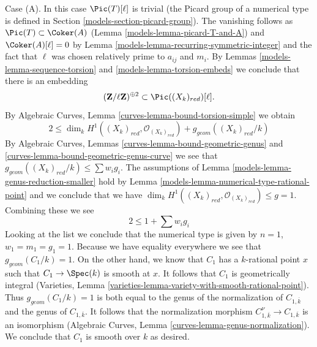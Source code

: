 \medskip\noindent
Case (A). In this case $\Pic(T)[\ell]$ is trivial (the Picard group
of a numerical type is defined in Section \ref{models-section-picard-group}).
The vanishing follows as $\Pic(T) \subset \Coker(A)$
(Lemma \ref{models-lemma-picard-T-and-A}) and $\Coker(A)[\ell] = 0$ by
Lemma \ref{models-lemma-recurring-symmetric-integer} and the
fact that $\ell$ was chosen relatively prime to $a_{ij}$ and $m_i$.
By Lemmas \ref{models-lemma-sequence-torsion} and \ref{models-lemma-torsion-embeds}
we conclude that there is an embedding
$$
(\mathbf{Z}/\ell \mathbf{Z})^{\oplus 2} \subset \Pic((X_k)_{red})[\ell].
$$
By Algebraic Curves, Lemma \ref{curves-lemma-bound-torsion-simple} we obtain
$$
2 \leq \dim_k H^1((X_k)_{red}, \mathcal{O}_{(X_k)_{red}}) +
g_{geom}((X_k)_{red}/k)
$$
By Algebraic Curves, Lemmas \ref{curves-lemma-bound-geometric-genus} and
\ref{curves-lemma-bound-geometric-genus-curve}
we see that $g_{geom}((X_k)_{red}/k) \leq \sum w_ig_i$.
The assumptions of Lemma \ref{models-lemma-genus-reduction-smaller}
hold by Lemma \ref{models-lemma-numerical-type-rational-point} and we
conclude that we have
$\dim_k H^1((X_k)_{red}, \mathcal{O}_{(X_k)_{red}}) \leq g = 1$.
Combining these we see
$$
2 \leq 1 + \sum w_i g_i
$$
Looking at the list we conclude that the numerical type is given by
$n = 1$, $w_1 = m_1 = g_1 = 1$. Because we have equality everywhere
we see that $g_{geom}(C_1/k) = 1$. On the other hand, we know
that $C_1$ has a $k$-rational point $x$ such that $C_1 \to \Spec(k)$
is smooth at $x$. It follows that $C_1$ is geometrically integral
(Varieties, Lemma \ref{varieties-lemma-variety-with-smooth-rational-point}).
Thus $g_{geom}(C_1/k) = 1$ is both equal to the genus of the normalization
of $C_{1, \overline{k}}$ and the genus of $C_{1, \overline{k}}$.
It follows that the normalization morphism
$C_{1, \overline{k}}^\nu \to C_{1, \overline{k}}$
is an isomorphism
(Algebraic Curves, Lemma \ref{curves-lemma-genus-normalization}).
We conclude that $C_1$ is smooth over $k$ as desired.

